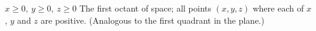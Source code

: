 {$x\geq 0,\ y\geq0, \ z\geq0$
}
{The first octant of space; all points $(x,y,z)$ where each of $x$, $y$ and $z$ are positive. (Analogous to the first quadrant in the plane.)
}
